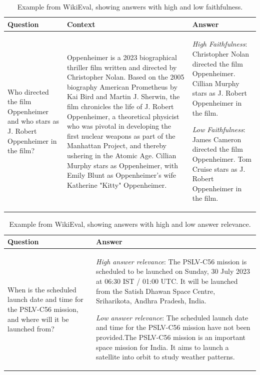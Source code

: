 \documentclass[11pt]{article}
\begin{document}
\begin{table}
\footnotesize
\centering
\begin{tabular}{p{90pt}p{200pt}p{120pt}}
\toprule
\textbf{Question} & \textbf{Context} & \textbf{Answer} \\
\midrule
Who directed the film Oppenheimer and who stars as J. Robert Oppenheimer in the film? &
Oppenheimer is a 2023 biographical thriller film written and directed by Christopher Nolan. Based on the 2005 biography American Prometheus by Kai Bird and Martin J. Sherwin, the film chronicles the life of J. Robert Oppenheimer, a theoretical physicist who was pivotal in developing the first nuclear weapons as part of the Manhattan Project, and thereby ushering in the Atomic Age. Cillian Murphy stars as Oppenheimer, with Emily Blunt as Oppenheimer's wife Katherine "Kitty" Oppenheimer.&
\textit{High Faithfulness}:
Christopher Nolan directed the film Oppenheimer. Cillian Murphy stars as J. Robert Oppenheimer in the film.

\smallskip
\textit{Low Faithfulness}:
James Cameron directed the film Oppenheimer. Tom Cruise stars as J. Robert Oppenheimer in the film.\\
\bottomrule
\end{tabular}
\caption{Example from WikiEval, showing answers with high and low faithfulness. \label{tabExamplesWikiEvalFaithfulness}}
\end{table}


\begin{table}
\footnotesize
\centering
\begin{tabular}{p{90pt}p{330pt}}
\toprule
\textbf{Question} & \textbf{Answer} \\
\midrule
When is the scheduled launch date and time for the PSLV-C56 mission, and where will it be launched from?
& \textit{High answer relevance}: The PSLV-C56 mission is scheduled to be launched on Sunday, 30 July 2023 at 06:30 IST / 01:00 UTC. It will be launched from the Satish Dhawan Space Centre, Sriharikota, Andhra Pradesh, India.

\smallskip
\textit{Low answer relevance}: The scheduled launch date and time for the PSLV-C56 mission have not been provided.The PSLV-C56 mission is an important space mission for India. It aims to launch a satellite into orbit to study weather patterns.\\
\bottomrule
\end{tabular}
\caption{Example from WikiEval, showing answers with high and low answer relevance. \label{tabExamplesWikiEvalAnswerRelevance}}
\end{table}
\end{document}
